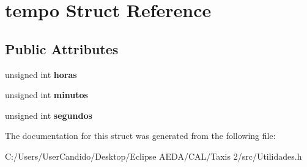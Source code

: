 \hypertarget{structtempo}{}\section{tempo Struct Reference}
\label{structtempo}
\subsection*{Public Attributes}
\begin{DoxyCompactItemize}
\item 
\hypertarget{structtempo_af07a6c5c7f27e3b596465ec4d386dd98}{}\label{structtempo_af07a6c5c7f27e3b596465ec4d386dd98} 
unsigned int {\bfseries horas}
\item 
\hypertarget{structtempo_aae3067bdb5661fc78b9b5cbf7f806509}{}\label{structtempo_aae3067bdb5661fc78b9b5cbf7f806509} 
unsigned int {\bfseries minutos}
\item 
\hypertarget{structtempo_ac8b581153430a11ec9c573062efb928f}{}\label{structtempo_ac8b581153430a11ec9c573062efb928f} 
unsigned int {\bfseries segundos}
\end{DoxyCompactItemize}


The documentation for this struct was generated from the following file\+:\begin{DoxyCompactItemize}
\item 
C\+:/\+Users/\+User\+Candido/\+Desktop/\+Eclipse A\+E\+D\+A/\+C\+A\+L/\+Taxis 2/src/Utilidades.\+h\end{DoxyCompactItemize}
